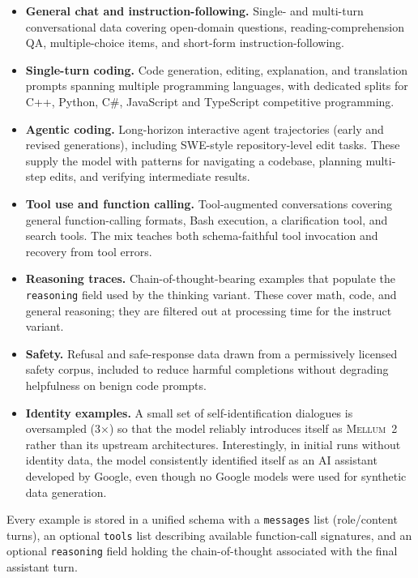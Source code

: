 \documentclass[11pt,a4paper]{article}
\newcommand{\modelname}{\textsc{Mellum~2}\xspace}
\begin{document}
\begin{itemize}
  \item \textbf{General chat and instruction-following.} Single- and
    multi-turn conversational data covering open-domain questions,
    reading-comprehension QA, multiple-choice items, and short-form
    instruction-following. 
  \item \textbf{Single-turn coding.} Code generation, editing, explanation,
    and translation prompts spanning multiple programming languages, with
    dedicated splits for C++, Python, C\#, JavaScript and TypeScript competitive programming.
  \item \textbf{Agentic coding.} Long-horizon interactive agent trajectories
    (early and revised generations), including SWE-style repository-level edit tasks. These supply
    the model with patterns for navigating a codebase, planning multi-step
    edits, and verifying intermediate results.
  \item \textbf{Tool use and function calling.} Tool-augmented
    conversations covering general function-calling formats, Bash execution, a
    clarification tool, and search tools. The mix
    teaches both schema-faithful tool invocation and recovery from tool
    errors.
  \item \textbf{Reasoning traces.} Chain-of-thought-bearing examples that
    populate the \texttt{reasoning} field used by the thinking variant.
    These cover math, code, and general reasoning; they are filtered out at
    processing time for the instruct variant.
  \item \textbf{Safety.} Refusal and safe-response data drawn from a
    permissively licensed safety corpus, included to reduce harmful
    completions without degrading helpfulness on benign code prompts.
  \item \textbf{Identity examples.} A small set of self-identification dialogues is
    oversampled (3$\times$) so that the model reliably introduces itself as
    \modelname rather than its upstream architectures. Interestingly, in initial runs without identity data, the model consistently identified itself as an AI assistant developed by Google, even though no Google models were used for synthetic data generation.
\end{itemize}

Every example is stored in a unified schema with a \texttt{messages} list
(role/content turns), an optional \texttt{tools} list describing available
function-call signatures, and an optional \texttt{reasoning} field holding
the chain-of-thought associated with the final assistant turn.
\end{document}
